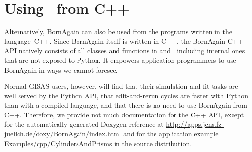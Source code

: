
\section{Using \BornAgain\ from C++}

Alternatively, BornAgain can also be used from the programs written
in the language~C++.
Since BornAgain itself is written in C++,
%
the BornAgain C++ API natively consists of
all classes and functions in  and ,
%
%
including internal ones that are not exposed to Python.
It empowers application programmers to use BornAgain
in ways we cannot foresee.

Normal GISAS users, however, will find that their simulation and fit tasks
are well served by the Python API,
that edit-and-rerun cycles are faster with Python than with a compiled language,
and that there is no need to use BornAgain from C++.
Therefore, we provide not much documentation for the C++ API,
except for the automatically generated Doxygen reference at
\url{http://apps.jcns.fz-juelich.de/doxy/BornAgain/index.html} and
for the application example \url{Examples/cpp/CylindersAndPrisms}
in the source distribution.


